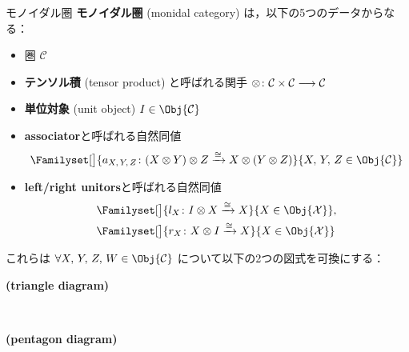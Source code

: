 \documentclass[TQFT_main]{subfiles}
\begin{document}
\begin{mydef}[label=def:monoidal-category,breakable]{モノイダル圏}
    \textbf{モノイダル圏} (monidal category) は，以下の5つのデータからなる：
    \begin{itemize}
        \item 圏 $\mathcal{C}$
        \item \textbf{テンソル積} (tensor product) と呼ばれる関手 $\otimes \colon \mathcal{C} \times \mathcal{C} \longrightarrow \mathcal{C}$
        \item \textbf{単位対象} (unit object) $I \in \Obj{\mathcal{C}}$
        \item \textbf{associator}と呼ばれる自然同値
        \begin{align}
            \Familyset[\big]{a_{X,\, Y,\, Z} \colon (X \otimes Y) \otimes Z \xrightarrow{\cong} X \otimes (Y \otimes Z)}{X,\, Y,\, Z \in \Obj{\mathcal{C}}}
        \end{align}
        \item \textbf{left/right unitors}と呼ばれる自然同値
        \begin{align}
            &\Familyset[\big]{l_X \colon I \otimes X \xrightarrow{\cong} X}{X \in \Obj{\mathcal{X}}}, \\
            &\Familyset[\big]{r_X \colon X \otimes I \xrightarrow{\cong} X}{X \in \Obj{\mathcal{X}}}
        \end{align}
        
    \end{itemize}
    これらは $\forall X,\, Y,\, Z,\, W \in \Obj{\mathcal{C}}$ について以下の2つの図式を可換にする：
    \begin{description}
        \item[\textbf{(triangle diagram)}]　
        
        \begin{center}
        \end{center}
        
        \item[\textbf{(pentagon diagram)}]　
        

\end{description}
\end{mydef}
\end{document}
